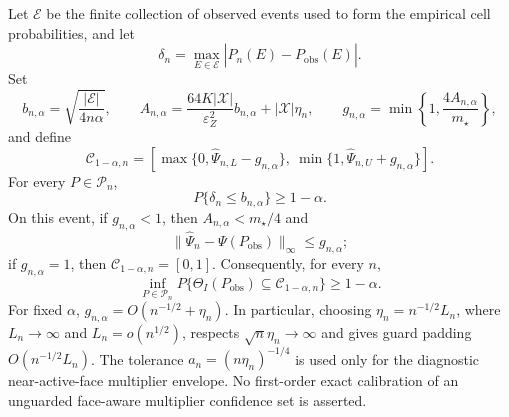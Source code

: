 Let \(\mathcal E\) be the finite collection of observed events used to form the empirical cell probabilities, and let
\[
\delta_n=\max_{E\in\mathcal E}\left|\widehat P_n(E)-P_{\mathrm{obs}}(E)\right|.
\]
Set
\[
b_{n,\alpha}=\sqrt{\frac{|\mathcal E|}{4n\alpha}},\qquad
A_{n,\alpha}=\frac{64K|\mathcal X|}{\varepsilon_Z^2}b_{n,\alpha}+|\mathcal X|\eta_n,
\qquad
g_{n,\alpha}=\min\left\{1,\frac{4A_{n,\alpha}}{m_{\star}}\right\},
\]
and define
\[
\mathcal C_{1-\alpha,n}
=\left[\max\{0,\widehat\Psi_{n,L}-g_{n,\alpha}\},\
\min\{1,\widehat\Psi_{n,U}+g_{n,\alpha}\}\right].
\]
For every \(P\in\mathcal P_n\),
\[
P\{\delta_n\le b_{n,\alpha}\}\ge 1-\alpha.
\]
On this event, if \(g_{n,\alpha}<1\), then \(A_{n,\alpha}<m_{\star}/4\) and
\[
\|\widehat\Psi_n-\Psi(P_{\mathrm{obs}})\|_\infty\le g_{n,\alpha};
\]
if \(g_{n,\alpha}=1\), then \(\mathcal C_{1-\alpha,n}=[0,1]\).  Consequently, for every \(n\),
\[
\inf_{P\in\mathcal P_n}P\{\Theta_I(P_{\mathrm{obs}})\subseteq\mathcal C_{1-\alpha,n}\}\ge1-\alpha.
\]
For fixed \(\alpha\), \(g_{n,\alpha}=O(n^{-1/2}+\eta_n)\).  In particular, choosing \(\eta_n=n^{-1/2}L_n\), where \(L_n\to\infty\) and \(L_n=o(n^{1/2})\), respects \(\sqrt n\eta_n\to\infty\) and gives guard padding \(O(n^{-1/2}L_n)\).  The tolerance \(a_n=(n\eta_n)^{-1/4}\) is used only for the diagnostic near-active-face multiplier envelope.  No first-order exact calibration of an unguarded face-aware multiplier confidence set is asserted.